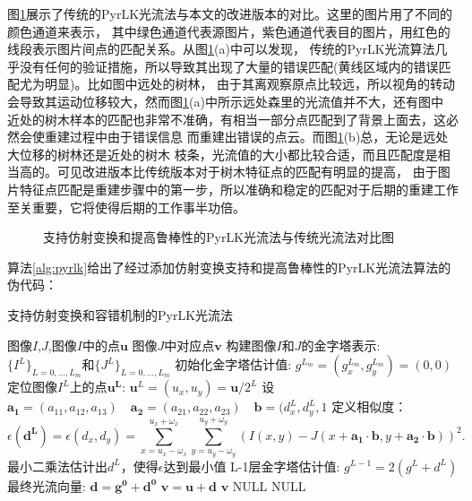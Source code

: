 图\ref{fig:pyrlk}展示了传统的PyrLK光流法与本文的改进版本的对比。这里的图片用了不同的颜色通道来表示，
其中绿色通道代表源图片，紫色通道代表目的图片，用红色的线段表示图片间点的匹配关系。从图\ref{fig:pyrlk}(a)中可以发现，
传统的PyrLK光流算法几乎没有任何的验证措施，所以导致其出现了大量的错误匹配(黄线区域内的错误匹配尤为明显)。比如图中远处的树林，
由于其离观察原点比较远，所以视角的转动会导致其运动位移较大，然而图\ref{fig:pyrlk}(a)中所示远处森里的光流值并不大，还有图中
近处的树木样本的匹配也非常不准确，有相当一部分点匹配到了背景上面去，这必然会使重建过程中由于错误信息
而重建出错误的点云。而图\ref{fig:pyrlk}(b)总，无论是远处大位移的树林还是近处的树木
枝条，光流值的大小都比较合适，而且匹配度是相当高的。可见改进版本比传统版本对于树木特征点的匹配有明显的提高，
由于图片特征点匹配是重建步骤中的第一步，所以准确和稳定的匹配对于后期的重建工作至关重要，它将使得后期的工作事半功倍。
\begin{figure}[H]
	\centering
	\hspace{4em}
	\caption{支持仿射变换和提高鲁棒性的PyrLK光流法与传统光流法对比图}
	\label{fig:pyrlk}
\end{figure}


\clearpage
算法\ref{alg:pyrlk}给出了经过添加仿射变换支持和提高鲁棒性的PyrLK光流法算法的伪代码：\\
\begin{algorithm}[H]
	\caption{支持仿射变换和容错机制的PyrLK光流法}
	\label{alg:pyrlk}
	\begin{algorithmic}[1]
		\Require 图像$I$,$J$,图像$I$中的点$\mathbf{u}$
		\Ensure 图像$J$中对应点$\mathbf{v}$
		\State 构建图像$I$和$J$的金字塔表示: $\{I^L\}_{L=0,...,L_m}$和$\{J^L\}_{L=0,...,L_m}$
		\State 初始化金字塔估计值: $g^{L_{m}}=(g_x^{L_m}, g_y^{L_m})=(0,0)$
		\State 定位图像$I^L$上的点$\mathbf{u^L}$: $\mathbf{u}^L=(u_x,u_y)=\mathbf{u}/2^L$
		\State 设$\mathbf{a_1}=(a_{11},a_{12},a_{13})\quad \mathbf{a_2}=(a_{21},a_{22},a_{23})\quad 
				\mathbf{b}=(d_x^L, d_y^L, 1$
		\State 定义相似度：
				\[ \epsilon(\mathbf{d^L})=\epsilon(d_x,d_y)=\sum_{x=u_x-\omega_x}^{u_x+\omega_x}\sum_{y=u_y-\omega_y}
				^{u_y+\omega_y}(I(x,y) - J(x+\mathbf{a_1}\cdot \mathbf{b},y+\mathbf{a_2}\cdot \mathbf{b}))^2.\]
				\State 最小二乘法估计出$d^L$，使得$\epsilon $达到最小值
		\State L-1层金字塔估计值: $g^{L-1}=2(g^L+d^L)$
		\EndFor
		\State 最终光流向量: $\mathbf{d}=\mathbf{g^0}+\mathbf{d^0}$
		\State $\mathbf{v}=\mathbf{u+d}$
				\State \Return $\mathbf{v}$
			\Else
				\State \Return NULL
			\EndIf
		\Else
			\State \Return NULL
		\EndIf
	\end{algorithmic}
\end{algorithm}

